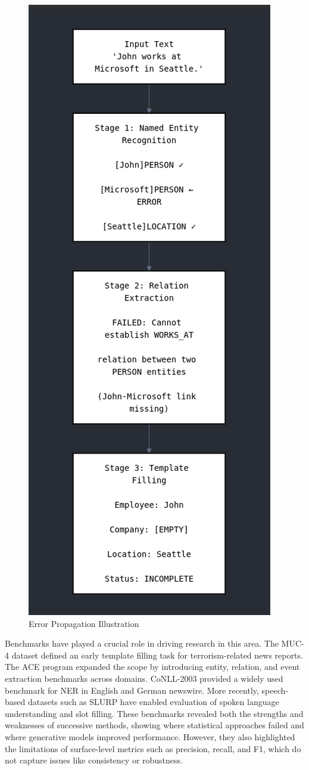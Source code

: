 \begin{figure}
    \centering
    \includegraphics[width=0.6\linewidth]{images/error_propagation.png}
    \caption{Error Propagation Illustration}
    \label{fig:placeholder}
\end{figure}

Benchmarks have played a crucial role in driving research in this area. The MUC-4 dataset \cite{chinchor1992muc} defined an early template filling task for terrorism-related news reports. The ACE program \cite{doddington2004ace} expanded the scope by introducing entity, relation, and event extraction benchmarks across domains. CoNLL-2003 \cite{tjong2003introduction} provided a widely used benchmark for NER in English and German newswire. More recently, speech-based datasets such as SLURP \cite{bastianelli2020slurp} have enabled evaluation of spoken language understanding and slot filling. These benchmarks revealed both the strengths and weaknesses of successive methods, showing where statistical approaches failed and where generative models improved performance. However, they also highlighted the limitations of surface-level metrics such as precision, recall, and F1, which do not capture issues like consistency or robustness.

